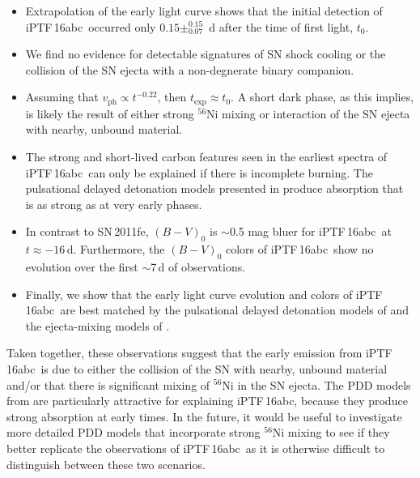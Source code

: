 \documentclass[twocolumn]{aastex61}
\newcommand{\abc}{iPTF\,16abc}
\begin{document}
\begin{itemize} 
    
    \item Extrapolation of the early light curve shows that the initial
    detection of \abc\ occurred only $0.15\pm_{0.07}^{0.15}$~d after the time
    of first light, $t_0$.

    \item We find no evidence for detectable signatures of SN shock cooling or
    the collision of the SN ejecta with a non-degnerate binary companion.

    \item Assuming that $v_\mathrm{ph} \propto t^{-0.22}$, then
    $t_\mathrm{exp} \approx t_0$. A short dark phase, as this implies, is
    likely the result of either strong $^{56}$Ni mixing or interaction of the
    SN ejecta with nearby, unbound material.

    \item The strong and short-lived carbon features seen in the earliest
    spectra of \abc\ can only be explained if there is incomplete burning. The
    pulsational delayed detonation models presented in
    \citet{2014MNRAS.441..532D} produce  absorption that is as
    strong as  at very early phases.

    \item In contrast to SN\,2011fe, $(B - V)_0$ is $\sim$0.5 mag bluer for
    \abc\ at $t \approx -16$\,d. Furthermore, the $(B - V)_0$ colors of \abc\
    show no evolution over the first $\sim$7\,d of observations.

    \item Finally, we show that the early light curve evolution and colors of
    \abc\ are best matched by the pulsational delayed detonation
    models of \citet{2014MNRAS.441..532D} and the ejecta-mixing models of
    \citet{2016ApJ...826...96P}.
 
\end{itemize}
%
Taken together, these observations suggest that the early emission
from \abc\ is due to either the collision of the SN with nearby, unbound
material and/or that there is significant mixing of $^{56}$Ni in the SN
ejecta. The PDD models from \citet{2014MNRAS.441..532D} are particularly
attractive for explaining \abc, because they produce strong
 absorption at early times. In the future, it would be useful to
investigate more detailed PDD models that incorporate strong $^{56}$Ni mixing
to see if they better replicate the observations of \abc\ as it is otherwise
difficult to distinguish between these two scenarios.
\end{document}
